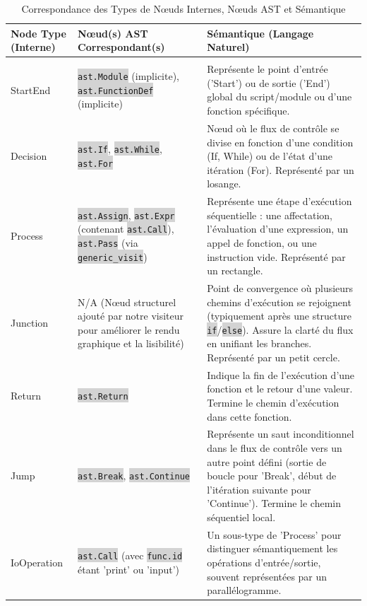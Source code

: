 \documentclass[11pt,a4paper]{article}
\newcommand{\code}[1]{\colorbox{lightgray}{\texttt{\small #1}}}
\begin{document}
\begin{longtable}{| p{3cm} | p{4cm} | p{8cm} |}
\caption{Correspondance des Types de Nœuds Internes, Nœuds AST et Sémantique}\label{tab:node-types}\\
\hline
\textbf{Node Type (Interne)} & \textbf{Nœud(s) AST Correspondant(s)} & \textbf{Sémantique (Langage Naturel)} \\
\hline
\endfirsthead
\hline
\endfoot
\hline
\multicolumn{3}{r}{\small\slshape Table suite en page suivante} \\
\hline
\endlastfoot
StartEnd & \code{ast.Module} (implicite), \code{ast.FunctionDef} (implicite) & Représente le point d'entrée ('Start') ou de sortie ('End') global du script/module ou d'une fonction spécifique. \\ \hline
Decision & \code{ast.If}, \code{ast.While}, \code{ast.For} & Nœud où le flux de contrôle se divise en fonction d'une condition (If, While) ou de l'état d'une itération (For). Représenté par un losange. \\ \hline
Process & \code{ast.Assign}, \code{ast.Expr} (contenant \code{ast.Call}), \code{ast.Pass} (via \code{generic\_visit}) & Représente une étape d'exécution séquentielle : une affectation, l'évaluation d'une expression, un appel de fonction, ou une instruction vide. Représenté par un rectangle. \\ \hline
Junction & N/A (Nœud structurel ajouté par notre visiteur pour améliorer le rendu graphique et la lisibilité) & Point de convergence où plusieurs chemins d'exécution se rejoignent (typiquement après une structure \code{if}/\code{else}). Assure la clarté du flux en unifiant les branches. Représenté par un petit cercle. \\ \hline
Return & \code{ast.Return} & Indique la fin de l'exécution d'une fonction et le retour d'une valeur. Termine le chemin d'exécution dans cette fonction. \\ \hline
Jump & \code{ast.Break}, \code{ast.Continue} & Représente un saut inconditionnel dans le flux de contrôle vers un autre point défini (sortie de boucle pour 'Break', début de l'itération suivante pour 'Continue'). Termine le chemin séquentiel local. \\ \hline
IoOperation & \code{ast.Call} (avec \code{func.id} étant 'print' ou 'input') & Un sous-type de 'Process' pour distinguer sémantiquement les opérations d'entrée/sortie, souvent représentées par un parallélogramme. \\ \hline
\end{longtable}
\end{document}
